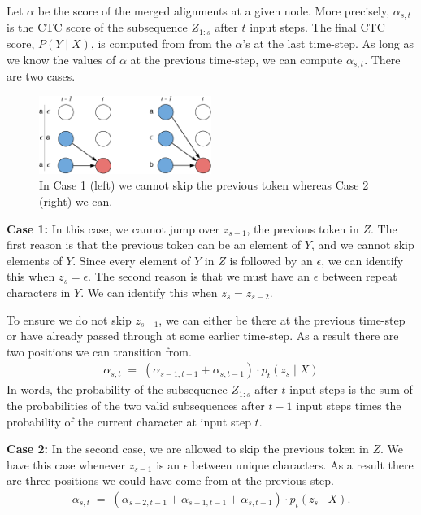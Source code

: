 Let $\alpha$ be the score of the merged alignments at a given node. More
precisely, $\alpha_{s, t}$ is the CTC score of the subsequence $Z_{1:s}$ after
$t$ input steps.  The final CTC score, $P(Y \mid X)$, is computed from from the
$\alpha$'s at the last time-step. As long as we know the values of $\alpha$ at
the previous time-step, we can compute $\alpha_{s, t}$. There are two cases.

\begin{figure}[ht!]
\centering
\includegraphics[width=0.5\textwidth]{background/figures/cases.pdf}
\caption{In Case 1 (left) we cannot skip the previous token whereas Case 2
    (right) we can.}
\end{figure}

{\bf Case 1:} In this case, we cannot jump over $z_{s-1}$, the previous token
in $Z$. The first reason is that the previous token can be an element of $Y$,
and we cannot skip elements of $Y$. Since every element of $Y$ in $Z$ is
followed by an $\epsilon$, we can identify this when $z_{s} = \epsilon$. The
second reason is that we must have an $\epsilon$ between repeat characters in
$Y$. We can identify this when $z_s = z_{s-2}$.

To ensure we do not skip $z_{s-1}$, we can either be there at the previous
time-step or have already passed through at some earlier time-step. As a result
there are two positions we can transition from.
\begin{align*}
\alpha_{s, t} \; = \; (\alpha_{s-1, t-1} + \alpha_{s, t-1}) \cdot p_t(z_{s} \mid X)
\end{align*}
In words, the probability of the subsequence $Z_{1:s}$ after $t$ input steps is
the sum of the probabilities of the two valid subsequences after $t-1$ input
steps times the probability of the current character at input step $t$.

{\bf Case 2:} In the second case, we are allowed to skip the previous token in
$Z$. We have this case whenever $z_{s-1}$ is an $\epsilon$ between unique
characters. As a result there are three positions we could have come from at
the previous step.
\begin{align*}
\alpha_{s, t} \; = \; (\alpha_{s-2, t-1} + \alpha_{s-1, t-1} + \alpha_{s, t-1}) \cdot
    p_t(z_{s} \mid X).
\end{align*}

